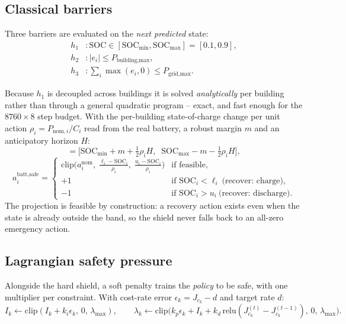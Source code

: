 \documentclass[11pt]{article}
\begin{document}
\subsection{Classical barriers}

Three barriers are evaluated on the \emph{next predicted} state:
\begin{align}
h_1&: \text{SOC} \in [\text{SOC}_{\min}, \text{SOC}_{\max}] = [0.1, 0.9], \label{eq:h1}\\
h_2&: |e_i| \le P_{\text{building,max}}, \label{eq:h2}\\
h_3&: \textstyle\sum_i \max(e_i, 0) \le P_{\text{grid,max}}. \label{eq:h3}
\end{align}

Because $h_1$ is decoupled across buildings it is solved \emph{analytically} per
building rather than through a general quadratic program -- exact, and fast
enough for the $8760 \times 8$ step budget. With the per-building state-of-charge
change per unit action $\rho_i = P_{\text{nom},i}/C_i$ read from the real
battery, a robust margin $m$ and an anticipatory horizon $H$:
\begin{equation}
[\ell_i, u_i] = \Big[\text{SOC}_{\min} + m + \tfrac{1}{2}\rho_i H,\;\; \text{SOC}_{\max} - m - \tfrac{1}{2}\rho_i H\Big],
\label{eq:enforced-band}
\end{equation}
\begin{equation}
a^{\text{batt,safe}}_i =
\begin{cases}
\mathrm{clip}\Big(a^{\text{nom}}_i,\; \tfrac{\ell_i - \text{SOC}_i}{\rho_i},\; \tfrac{u_i - \text{SOC}_i}{\rho_i}\Big) & \text{if feasible}, \\[6pt]
+1 & \text{if } \text{SOC}_i < \ell_i \ \text{(recover: charge)}, \\[2pt]
-1 & \text{if } \text{SOC}_i > u_i \ \text{(recover: discharge)}.
\end{cases}
\label{eq:cbf-projection}
\end{equation}
The projection is feasible by construction: a recovery action exists even when
the state is already outside the band, so the shield never falls back to an
all-zero emergency action.

\subsection{Lagrangian safety pressure}

Alongside the hard shield, a soft penalty trains the \emph{policy} to be safe,
with one multiplier per constraint. With cost-rate error
$\epsilon_k = J_{c_k} - d$ and target rate $d$:
\begin{equation}
I_k \leftarrow \mathrm{clip}(I_k + k_i \epsilon_k,\, 0,\, \lambda_{\max}), \qquad
\lambda_k \leftarrow \mathrm{clip}\big(k_p \epsilon_k + I_k + k_d\, \mathrm{relu}(J_{c_k}^{(t)} - J_{c_k}^{(t-1)}),\, 0,\, \lambda_{\max}\big).
\label{eq:pid-lagrangian}
\end{equation}
\end{document}
